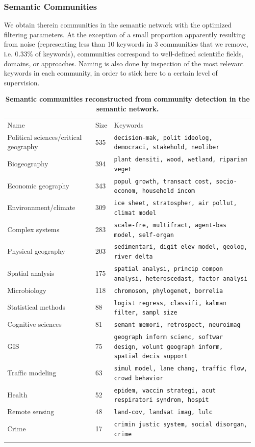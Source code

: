 \subsubsection*{Semantic Communities}

We obtain therein communities in the semantic network with the optimized filtering parameters. At the exception of a small proportion apparently resulting from noise (representing less than 10 keywords in 3 communities that we remove, i.e. 0.33\% of keywords), communities correspond to well-defined scientific fields, domains, or approaches. Naming is also done by inspection of the most relevant keywords in each community, in order to stick here to a certain level of supervision.



\begin{table}
\caption{\textbf{Semantic communities reconstructed from community detection in the semantic network.}}
\label{tab:domains}
\hspace{-2cm}
\begin{tabular}{lll}
\hline\noalign{\smallskip}
Name & Size & Keywords  \\
\noalign{\smallskip}\hline\noalign{\smallskip}
Political sciences/critical geography & 535 & \texttt{decision-mak, polit ideolog, democraci, stakehold, neoliber} \\
Biogeography & 394 & \texttt{plant densiti, wood, wetland, riparian veget} \\
Economic geography & 343 &  \texttt{popul growth, transact cost, socio-econom, household incom} \\
Environnment/climate & 309 & \texttt{ice sheet, stratospher, air pollut, climat model} \\
Complex systems & 283 & \texttt{scale-fre, multifract, agent-bas model, self-organ} \\
Physical geography & 203 & \texttt{sedimentari, digit elev model, geolog, river delta} \\
Spatial analysis & 175 & \texttt{spatial analysi, princip compon analysi, heteroscedast, factor analysi} \\
Microbiology & 118 & \texttt{chromosom, phylogenet, borrelia} \\
Statistical methods & 88 & \texttt{logist regress, classifi, kalman filter, sampl size} \\
Cognitive sciences & 81 & \texttt{semant memori, retrospect, neuroimag} \\
GIS & 75 & \texttt{geograph inform scienc, softwar design, volunt geograph inform, spatial decis support} \\
Traffic modeling & 63 & \texttt{simul model, lane chang, traffic flow, crowd behavior} \\
Health & 52 & \texttt{epidem, vaccin strategi, acut respiratori syndrom, hospit} \\
Remote sensing & 48 & \texttt{land-cov, landsat imag, lulc} \\
Crime & 17 & \texttt{crimin justic system, social disorgan, crime} \\
\noalign{\smallskip}\hline
\end{tabular}
\end{table}


